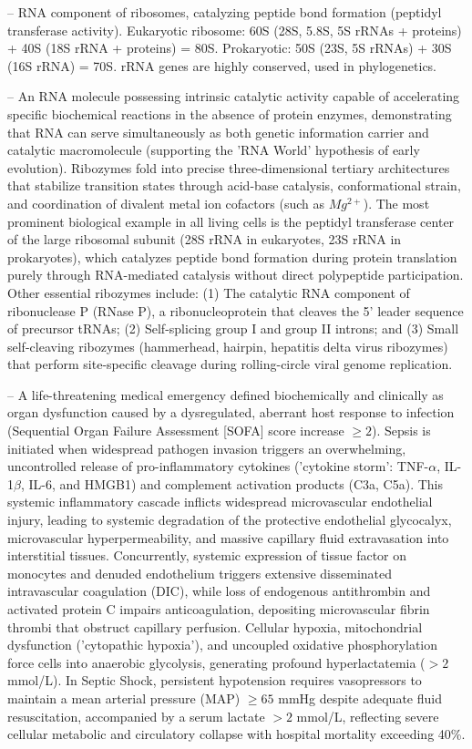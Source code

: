 -- RNA component of ribosomes, catalyzing peptide bond formation (peptidyl transferase activity). Eukaryotic ribosome: 60S (28S, 5.8S, 5S rRNAs + proteins) + 40S (18S rRNA + proteins) = 80S. Prokaryotic: 50S (23S, 5S rRNAs) + 30S (16S rRNA) = 70S. rRNA genes are highly conserved, used in phylogenetics.

-- An RNA molecule possessing intrinsic catalytic activity capable of accelerating specific biochemical reactions in the absence of protein enzymes, demonstrating that RNA can serve simultaneously as both genetic information carrier and catalytic macromolecule (supporting the 'RNA World' hypothesis of early evolution). Ribozymes fold into precise three-dimensional tertiary architectures that stabilize transition states through acid-base catalysis, conformational strain, and coordination of divalent metal ion cofactors (such as $Mg^{2+}$). The most prominent biological example in all living cells is the peptidyl transferase center of the large ribosomal subunit (28S rRNA in eukaryotes, 23S rRNA in prokaryotes), which catalyzes peptide bond formation during protein translation purely through RNA-mediated catalysis without direct polypeptide participation. Other essential ribozymes include: (1) The catalytic RNA component of ribonuclease P (RNase P), a ribonucleoprotein that cleaves the 5' leader sequence of precursor tRNAs; (2) Self-splicing group I and group II introns; and (3) Small self-cleaving ribozymes (hammerhead, hairpin, hepatitis delta virus ribozymes) that perform site-specific cleavage during rolling-circle viral genome replication.

-- A life-threatening medical emergency defined biochemically and clinically as organ dysfunction caused by a dysregulated, aberrant host response to infection (Sequential Organ Failure Assessment [SOFA] score increase $\ge 2$). Sepsis is initiated when widespread pathogen invasion triggers an overwhelming, uncontrolled release of pro-inflammatory cytokines ('cytokine storm': TNF-$\alpha$, IL-1$\beta$, IL-6, and HMGB1) and complement activation products (C3a, C5a). This systemic inflammatory cascade inflicts widespread microvascular endothelial injury, leading to systemic degradation of the protective endothelial glycocalyx, microvascular hyperpermeability, and massive capillary fluid extravasation into interstitial tissues. Concurrently, systemic expression of tissue factor on monocytes and denuded endothelium triggers extensive disseminated intravascular coagulation (DIC), while loss of endogenous antithrombin and activated protein C impairs anticoagulation, depositing microvascular fibrin thrombi that obstruct capillary perfusion. Cellular hypoxia, mitochondrial dysfunction ('cytopathic hypoxia'), and uncoupled oxidative phosphorylation force cells into anaerobic glycolysis, generating profound hyperlactatemia ($>2$ mmol/L). In Septic Shock, persistent hypotension requires vasopressors to maintain a mean arterial pressure (MAP) $\ge 65$ mmHg despite adequate fluid resuscitation, accompanied by a serum lactate $>2$ mmol/L, reflecting severe cellular metabolic and circulatory collapse with hospital mortality exceeding 40\%.

